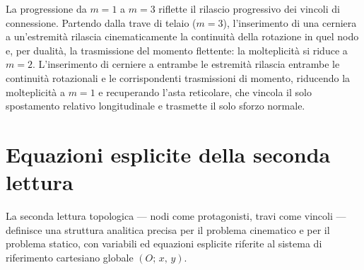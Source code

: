 




\begin{oss}
	La progressione da $m = 1$ a $m = 3$ riflette
	il rilascio progressivo dei vincoli di
	connessione. Partendo dalla trave di telaio
	($m = 3$), l'inserimento di una cerniera a
	un'estremità rilascia cinematicamente la
	continuità della rotazione in quel nodo e,
	per dualità, la trasmissione del momento
	flettente: la molteplicità si riduce a $m = 2$.
	L'inserimento di cerniere a entrambe le estremità
	rilascia entrambe le continuità rotazionali e
	le corrispondenti trasmissioni di momento,
	riducendo la molteplicità a $m = 1$ e
	recuperando l'asta reticolare, che vincola
	il solo spostamento relativo longitudinale e
	trasmette il solo sforzo normale.
\end{oss}


\section{Equazioni esplicite della seconda lettura}
\label{sec:equazioni_seconda_lettura_telai}

La seconda lettura topologica --- nodi come protagonisti,
travi come vincoli --- definisce una struttura analitica
precisa per il problema cinematico e per il problema
statico, con variabili ed equazioni esplicite riferite
al sistema di riferimento cartesiano globale
$(O;\, x,\, y)$.




